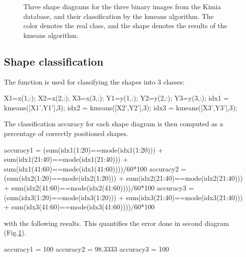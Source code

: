\begin{figure}[htbp]
 \caption{Three shape diagrams for the three binary images from the Kimia database, and their classification by the kmeans algorithm. The color denotes the real class, and the shape denotes the results of the kmeans algorithm.}
 \label{fig:shape_diagrams:matlab:shapeDiagrams}
\end{figure}

\subsection{Shape classification}
The \matlabregistered{} function  is used for classifying the shapes into 3 classes:
\begin{matlab}
X1=x(1,:);
X2=x(2,:);
X3=x(3,:);
Y1=y(1,:);
Y2=y(2,:);
Y3=y(3,:);
idx1 = kmeans([X1',Y1'],3);
idx2 = kmeans([X2',Y2'],3);
idx3 = kmeans([X3',Y3'],3);
\end{matlab}

The classification accuracy for each shape diagram is then computed as a percentage of correctly positioned shapes.
\begin{matlab}
accuracy1 = (sum(idx1(1:20)==mode(idx1(1:20))) + sum(idx1(21:40)==mode(idx1(21:40))) + sum(idx1(41:60)==mode(idx1(41:60))))/60*100
accuracy2 = (sum(idx2(1:20)==mode(idx2(1:20))) + sum(idx2(21:40)==mode(idx2(21:40))) + sum(idx2(41:60)==mode(idx2(41:60))))/60*100
accuracy3 = (sum(idx3(1:20)==mode(idx3(1:20))) + sum(idx3(21:40)==mode(idx3(21:40))) + sum(idx3(41:60)==mode(idx3(41:60))))/60*100
\end{matlab}
with the following results. This quantifies the error done in second diagram (Fig.\ref{fig:shape_diagrams:matlab:shapeDiagrams}).
\begin{mwindow}
accuracy1 = 100
accuracy2 = 98.3333
accuracy3 = 100
\end{mwindow}
